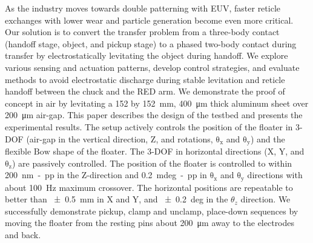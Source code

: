 \documentclass[letterpaper,10pt,onecolumn]{aspe}
\begin{document}
As the industry moves towards double patterning with EUV, faster reticle exchanges with lower wear and particle generation become even more critical. Our solution is to convert the transfer problem from a three-body contact (handoff stage, object, and pickup stage) to a phased two-body contact during transfer by electrostatically levitating the object during handoff.
We explore various sensing and actuation patterns, develop control strategies, and evaluate methods to avoid electrostatic discharge during stable levitation and reticle handoff between the chuck and the RED arm. We demonstrate the proof of concept in air by levitating a \num{152} by \SI{152}{mm}, \SI{400}{\micro\meter} thick aluminum sheet over \SI{200}{\micro\meter} air-gap.
This paper describes the design of the testbed and presents the experimental results.
The setup actively controls the position of the floater in 3-DOF (air-gap in the vertical direction, \(\mathrm{Z}\), and rotations, \(\mathrm{\theta_x}\) and \(\mathrm{\theta_y}\)) and the flexible \(\mathrm{Bow}\) shape of the floater. The 3-DOF in horizontal directions (\(\mathrm{X}\), \(\mathrm{Y}\), and \(\mathrm{\theta_z}\)) are passively controlled. The position of the floater is controlled to within \SI{200}{nm-pp} in the \(\mathrm{Z}\)-direction and \SI{0.2}{mdeg-pp} in \(\mathrm{\theta_x}\) and \(\mathrm{\theta_y}\) directions with about \SI{100}{Hz} maximum crossover. The horizontal positions are repeatable to better than \SI{\pm 0.5}{mm} in \(\mathrm{X}\) and \(\mathrm{Y}\), and \SI{\pm 0.2}{deg} in the \(\theta_z\) direction.
We successfully demonstrate pickup, clamp and unclamp, place-down sequences by moving the floater from the resting pins about \SI{200}{\micro\meter} away to the electrodes and back.
\end{document}
